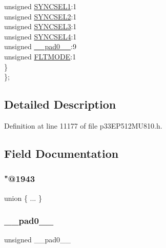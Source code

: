 \begin{DoxyCompactItemize}
\begin{tabbing}
\>\>unsigned \hyperlink{structtag_o_c2_c_o_n2_b_i_t_s_a50e73f95ab1c258ddc64f69c0991deaf}{SYNCSEL1}:1\\
\>\>unsigned \hyperlink{structtag_o_c2_c_o_n2_b_i_t_s_a304907a5d2c4cbf1114a54642a85951e}{SYNCSEL2}:1\\
\>\>unsigned \hyperlink{structtag_o_c2_c_o_n2_b_i_t_s_a6bbd1bd2ead6c9fa713969c6eb0f0c75}{SYNCSEL3}:1\\
\>\>unsigned \hyperlink{structtag_o_c2_c_o_n2_b_i_t_s_a0cd5bbe196c7974953909d27a6307bb7}{SYNCSEL4}:1\\
\>\>unsigned \hyperlink{structtag_o_c2_c_o_n2_b_i_t_s_adf71f3d8410c1f1dbbc96680a92c49af}{\_\_pad0\_\_}:9\\
\>\>unsigned \hyperlink{structtag_o_c2_c_o_n2_b_i_t_s_ad53c2a5303780172219bfd5e0100c782}{FLTMODE}:1\\
\>\} \\
\}; \\

\end{tabbing}\end{DoxyCompactItemize}


\subsection{Detailed Description}


Definition at line 11177 of file p33\+E\+P512\+M\+U810.\+h.



\subsection{Field Documentation}
\mbox{\label{structtag_o_c2_c_o_n2_b_i_t_s_aa229aabdfa925bc077195fe047022718}} 
\subsubsection{\texorpdfstring{"@1943}{@1943}}
{\footnotesize\ttfamily union \{ ... \} }

\mbox{\label{structtag_o_c2_c_o_n2_b_i_t_s_adf71f3d8410c1f1dbbc96680a92c49af}} 
\subsubsection{\texorpdfstring{\+\_\+\+\_\+pad0\+\_\+\+\_\+}{\_\_pad0\_\_}}
{\footnotesize\ttfamily unsigned \+\_\+\+\_\+pad0\+\_\+\+\_\+}



